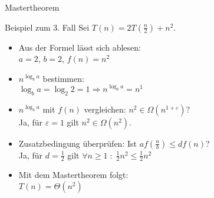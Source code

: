 \begin{frame}{Mastertheorem}
    \begin{exampleblock}{Beispiel zum 3. Fall}
    	Sei $T(n) = 2 T \left(\frac{n}{2} \right) + n^2$.
    	\begin{itemize}
    		\item Aus der Formel lässt sich ablesen:\\
    			$a=2$, $b=2$, $f(n)=n^2$
    		\item $n^{\log_b a}$ bestimmen:\\
    			$\log_b a = \log_2 2 = 1 \Rightarrow n^{\log_b a} = n^1$
    		\item $n^{\log_b a}$ mit $f(n)$ vergleichen: $n^2 \in \Omega(n^{1+\varepsilon})$?\\
    			Ja, für $\varepsilon = 1$ gilt $n^2 \in \Omega(n^2)$.
    		\item Zusatzbedingung überprüfen: Ist $af\left(\frac{n}{b}\right)\leq d f(n)$?\\
    			Ja, für $d = \frac{1}{2}$ gilt $\forall n \geq 1 \; : \; \frac{1}{2}n^2 \leq \frac{1}{2}n^2$
    		\item Mit dem Mastertheorem folgt:\\
    			$T(n) = \Theta(n^2)$
    	\end{itemize}
    \end{exampleblock}
\end{frame}